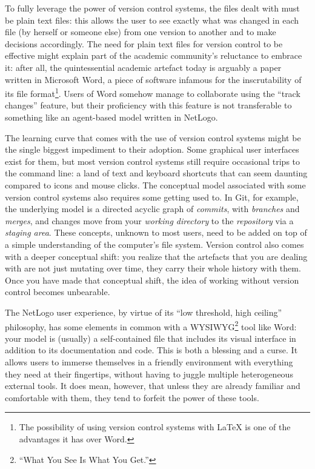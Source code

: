 \documentclass[runningheads]{llncs}
\begin{document}
To fully leverage the power of version control systems, the files dealt with must be plain text files: this allows the user to see exactly what was changed in each file (by herself or someone else) from one version to another and to make decisions accordingly. The need for plain text files for version control to be effective might explain part of the academic community's reluctance to embrace it: after all, the quintessential academic artefact today is arguably a paper written in Microsoft Word, a piece of software infamous for the inscrutability of its file format\footnote{The possibility of using version control systems with \LaTeX{} is one of the advantages it has over Word.}. Users of Word somehow manage to collaborate using the ``track changes'' feature, but their proficiency with this feature is not transferable to something like an agent-based model written in NetLogo.

The learning curve that comes with the use of version control systems might be the single biggest impediment to their adoption. Some graphical user interfaces exist for them, but most version control systems still require occasional trips to the command line: a land of text and keyboard shortcuts that can seem daunting compared to icons and mouse clicks. The conceptual model associated with some version control systems also requires some getting used to. In Git, for example, the underlying model is a directed acyclic graph of \emph{commits}, with \emph{branches} and \emph{merges}, and changes move from your \emph{working directory} to the \emph{repository} via a \emph{staging area}. These concepts, unknown to most users, need to be added on top of a simple understanding of the computer's file system. Version control also comes with a deeper conceptual shift: you realize that the artefacts that you are dealing with are not just mutating over time, they carry their whole history with them. Once you have made that conceptual shift, the idea of working without version control becomes unbearable.

The NetLogo user experience, by virtue of its ``low threshold, high ceiling'' philosophy, has some elements in common with a WYSIWYG\footnote{``What You See Is What You Get.''} tool like Word: your model is (usually) a self-contained file that includes its visual interface in addition to its documentation and code. This is both a blessing and a curse. It allows users to immerse themselves in a friendly environment with everything they need at their fingertips, without having to juggle multiple heterogeneous external tools. It does mean, however, that unless they are already familiar and comfortable with them, they tend to forfeit the power of these tools.
\end{document}
